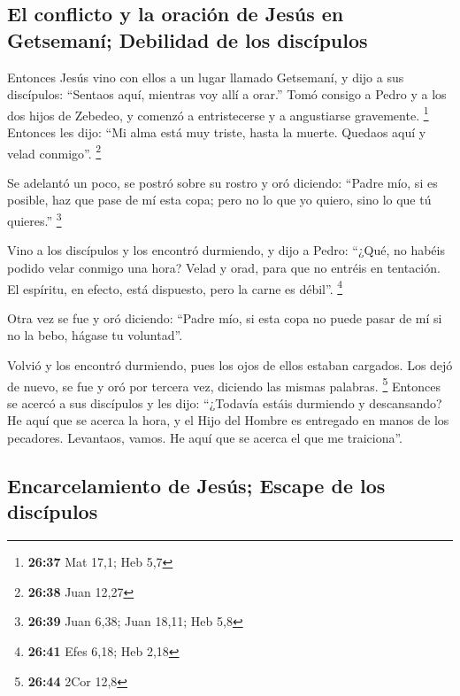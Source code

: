 \begin{paracol}{2}
\hypertarget{el-conflicto-y-la-oraciuxf3n-de-jesuxfas-en-getsemanuxed-debilidad-de-los-discuxedpulos}{%
\subsection{El conflicto y la oración de Jesús en Getsemaní; Debilidad
de los
discípulos}\label{el-conflicto-y-la-oraciuxf3n-de-jesuxfas-en-getsemanuxed-debilidad-de-los-discuxedpulos}}

 Entonces Jesús vino con ellos a un lugar llamado
Getsemaní, y dijo a sus discípulos: ``Sentaos aquí, mientras voy allí a
orar.''  Tomó consigo a Pedro y a los dos hijos de
Zebedeo, y comenzó a entristecerse y a angustiarse gravemente.
\footnote{\textbf{26:37} Mat 17,1; Heb 5,7}  Entonces les
dijo: ``Mi alma está muy triste, hasta la muerte. Quedaos aquí y velad
conmigo''. \footnote{\textbf{26:38} Juan 12,27}

 Se adelantó un poco, se postró sobre su rostro y oró
diciendo: ``Padre mío, si es posible, haz que pase de mí esta copa; pero
no lo que yo quiero, sino lo que tú quieres.'' \footnote{\textbf{26:39}
  Juan 6,38; Juan 18,11; Heb 5,8}

 Vino a los discípulos y los encontró durmiendo, y dijo a
Pedro: ``¿Qué, no habéis podido velar conmigo una hora? 
Velad y orad, para que no entréis en tentación. El espíritu, en efecto,
está dispuesto, pero la carne es débil''. \footnote{\textbf{26:41} Efes
  6,18; Heb 2,18}

 Otra vez se fue y oró diciendo: ``Padre mío, si esta
copa no puede pasar de mí si no la bebo, hágase tu voluntad''.

 Volvió y los encontró durmiendo, pues los ojos de ellos
estaban cargados.  Los dejó de nuevo, se fue y oró por
tercera vez, diciendo las mismas palabras. \footnote{\textbf{26:44} 2Cor
  12,8}  Entonces se acercó a sus discípulos y les dijo:
``¿Todavía estáis durmiendo y descansando? He aquí que se acerca la
hora, y el Hijo del Hombre es entregado en manos de los pecadores.
 Levantaos, vamos. He aquí que se acerca el que me
traiciona''.

\hypertarget{encarcelamiento-de-jesuxfas-escape-de-los-discuxedpulos}{%
\subsection{Encarcelamiento de Jesús; Escape de los
discípulos}\label{encarcelamiento-de-jesuxfas-escape-de-los-discuxedpulos}}


\end{paracol}
